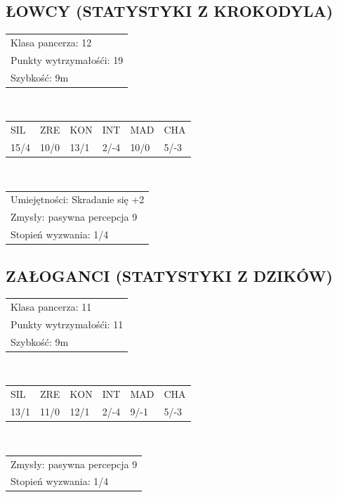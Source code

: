 \documentclass[14pt]{article}
\begin{document}
\subsection*{ŁOWCY (STATYSTYKI Z KROKODYLA)}
\begin{tabularx}{0,75\textwidth}{X}
    \hline
    Klasa pancerza: 12 \\
    Punkty wytrzymałośći: 19 \\
    Szybkość: 9m \\
    \hline
\end{tabularx} \\
\begin{tabularx}{0,75\textwidth}{YYYYYY}
    SIL & ZRE & KON & INT & MAD & CHA \\
    15/4 & 10/0 & 13/1 & 2/-4 & 10/0 & 5/-3 \\
\end{tabularx} \\
\begin{tabularx}{0,75\textwidth}{X}
    \hline
    Umiejętności: Skradanie się +2 \\
    Zmysły: pasywna percepcja 9 \\
    Stopień wyzwania: 1/4 \\
    \hline
\end{tabularx}

\subsection*{ZAŁOGANCI (STATYSTYKI Z DZIKÓW)}
\begin{tabularx}{0,75\textwidth}{X}
    \hline
    Klasa pancerza: 11 \\
    Punkty wytrzymałośći: 11 \\
    Szybkość: 9m \\
    \hline
\end{tabularx} \\
\begin{tabularx}{0,75\textwidth}{YYYYYY}
    SIL & ZRE & KON & INT & MAD & CHA \\
    13/1 & 11/0 & 12/1 & 2/-4 & 9/-1 & 5/-3 \\
\end{tabularx} \\
\begin{tabularx}{0,75\textwidth}{X}
    \hline
    Zmysły: pasywna percepcja 9 \\
    Stopień wyzwania: 1/4 \\
    \hline
\end{tabularx}
\end{document}
